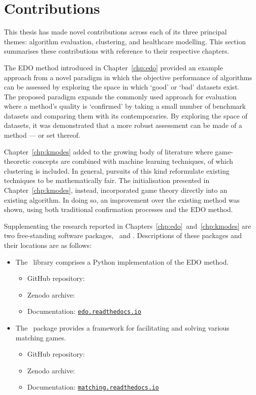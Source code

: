 \section{Contributions}\label{sec:contributions}

This thesis has made novel contributions across each of its three principal
themes: algorithm evaluation, clustering, and healthcare modelling. This section
summarises these contributions with reference to their respective chapters.

The EDO method introduced in Chapter~\ref{chp:edo} provided an example approach
from a novel paradigm in which the objective performance of algorithms can be
assessed by exploring the space in which `good' or `bad' datasets exist. The
proposed paradigm expands the commonly used approach for evaluation where a
method's quality is `confirmed' by taking a small number of benchmark datasets
and comparing them with its contemporaries. By exploring the space of datasets,
it was demonstrated that a more robust assessment can be made of a method --- or
set thereof.

Chapter~\ref{chp:kmodes} added to the growing body of literature where
game-theoretic concepts are combined with machine learning techniques, of which
clustering is included. In general, pursuits of this kind reformulate existing
techniques to be mathematically fair. The initialisation presented in
Chapter~\ref{chp:kmodes}, instead, incorporated game theory directly into an
existing algorithm. In doing so, an improvement over the existing method was
shown, using both traditional confirmation processes and the EDO method.

Supplementing the research reported in
Chapters~\ref{chp:edo}~and~\ref{chp:kmodes} are two free-standing software
packages, \edo\ and \matching. Descriptions of these packages and their
locations are as follows:

\begin{itemize}
    \item The \edo\ library comprises a Python implementation of the EDO method.
        \begin{itemize}
            \item GitHub repository: 
            \item Zenodo archive: 
            \item Documentation: \href{https://edo.readthedocs.io}{%
                \nolinkurl{edo.readthedocs.io}%
            }
        \end{itemize}
    \item The \matching\ package provides a framework for facilitating and
        solving various matching games.
        \begin{itemize}
            \item GitHub repository: 
            \item Zenodo archive: 
            \item Documentation: \href{https://matching.readthedocs.io}{%
                \nolinkurl{matching.readthedocs.io}%
            }
        \end{itemize}
\end{itemize}


